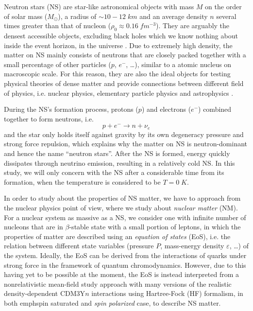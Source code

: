 
Neutron stars (\gls{NS}) are star-like astronomical objects with mass $M$ on the order of solar mass ($M_\odot$), a radius of $\sim 10-12\;km$ and an average density $n$ several times greater than that of nucleon ($\rho_0 \approx 0.16\;fm^{-3}$). They are arguably the densest accessible objects, excluding black holes which we know nothing about inside the event horizon, in the universe \cite{baym1975neutron}. Due to extremely high density, the matter on \gls{NS} mainly consists of neutrons that are closely packed together with a small percentage of other particles ($p$, $e^-$, \ldots), similar to a atomic nucleus on macroscopic scale. For this reason, they are also the ideal objects for testing physical theories of dense matter and provide connections between different field of physics, i.e. nuclear physics, elementary particle physics and astrophysics \cite{lattimer2004physics}.\par
During the \gls{NS}'s formation process, protons ($p$) and electrons ($e^-$) combined together to form neutrons, i.e.
\begin{equation}
        p + e^- \longrightarrow n + \nu_e
\end{equation}
and the star only holds itself against gravity by its own degeneracy pressure and strong force repulsion, which explains why the matter on \gls{NS} is neutron-dominant and hence the name ``neutron stars''. After the \gls{NS} is formed, energy quickly dissipates through neutrino emission, resulting in a relatively cold \gls{NS}. In this study, we will only concern with the \gls{NS} after a considerable time from its formation, when the temperature is considered to be $T=0\;K$.\par
In order to study about the properties of \gls{NS} matter, we have to approach from the nuclear physics point of view, where we study about \emph{nuclear matter} (\gls{NM}). For a nuclear system as massive as a \gls{NS}, we consider one with infinite number of nucleons that are in $\beta$-stable state with a small portion of leptons, in which the properties of matter are described using an \emph{equation of states} (\gls{EoS}), i.e. the relation between different state variables (pressure $P$, mass-energy density $\varepsilon$, \ldots) of the system. Ideally, the \gls{EoS} can be derived from the interactions of quarks under strong force in the framework of quantum chromodynamics. However, due to this having yet to be possible at the moment, the \gls{EoS} is instead interpreted from a nonrelativistic mean-field study approach with many versions of the realistic density-dependent CDM3Y$n$ interactions \cite{khoa1995equation,khoa2007mean} using Hartree-Fock (\gls{HF}) formalism, in both emph{spin saturated} and \emph{spin polarized} case, to describe \gls{NS} matter.


